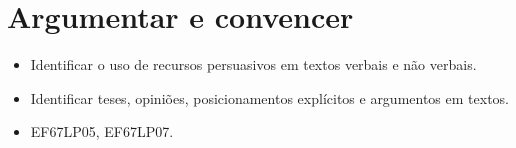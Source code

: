 \pagestyle{port}
\chapter{Argumentar e convencer}


\begin{itemize}

  \item Identificar o uso de recursos persuasivos em textos verbais e
não verbais.

  \item Identificar teses, opiniões, posicionamentos explícitos e argumentos em textos.

\end{itemize}


\begin{itemize}

  \item EF67LP05, EF67LP07.

\end{itemize}

